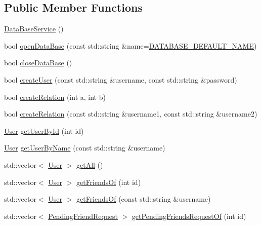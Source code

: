 \subsection*{Public Member Functions}
\begin{DoxyCompactItemize}
\item 
\mbox{\hyperlink{classDataBaseService_ac5820e66451a0393723eb87db0c98c97}{Data\+Base\+Service}} ()
\item 
bool \mbox{\hyperlink{classDataBaseService_a0f1095843e3650701cdd23ae8dbc09d8}{open\+Data\+Base}} (const std\+::string \&name=\mbox{\hyperlink{DataBaseService_8hpp_aed391e0e48987704aefc7aa59b508aa7}{D\+A\+T\+A\+B\+A\+S\+E\+\_\+\+D\+E\+F\+A\+U\+L\+T\+\_\+\+N\+A\+ME}})
\item 
bool \mbox{\hyperlink{classDataBaseService_a1106f4f3393298f38e66b8a7b6bc5dc1}{close\+Data\+Base}} ()
\item 
bool \mbox{\hyperlink{classDataBaseService_af13f9198530eda7dae7d4308ea25258c}{create\+User}} (const std\+::string \&username, const std\+::string \&password)
\item 
bool \mbox{\hyperlink{classDataBaseService_a1c133b9b35bb83281c96a1ccbf08aa5f}{create\+Relation}} (int a, int b)
\item 
bool \mbox{\hyperlink{classDataBaseService_a72fd8d920d0483b01db15518fa578e15}{create\+Relation}} (const std\+::string \&username1, const std\+::string \&username2)
\item 
\mbox{\hyperlink{structUser}{User}} \mbox{\hyperlink{classDataBaseService_a04a13e93541e53fa750bf169ec0b5b85}{get\+User\+By\+Id}} (int id)
\item 
\mbox{\hyperlink{structUser}{User}} \mbox{\hyperlink{classDataBaseService_a1e0272ebe8dd31859b810e6f797cde5b}{get\+User\+By\+Name}} (const std\+::string \&username)
\item 
std\+::vector$<$ \mbox{\hyperlink{structUser}{User}} $>$ \mbox{\hyperlink{classDataBaseService_a1226c799e69e1417202366d4c2f7137d}{get\+All}} ()
\item 
std\+::vector$<$ \mbox{\hyperlink{structUser}{User}} $>$ \mbox{\hyperlink{classDataBaseService_ac82ba94d3e80ccc2f576b14bf71c8c2e}{get\+Friends\+Of}} (int id)
\item 
std\+::vector$<$ \mbox{\hyperlink{structUser}{User}} $>$ \mbox{\hyperlink{classDataBaseService_a11c94f12e798e1bf70afa4581fa7c8b0}{get\+Friends\+Of}} (const std\+::string \&username)
\item 
std\+::vector$<$ \mbox{\hyperlink{structPendingFriendRequest}{Pending\+Friend\+Request}} $>$ \mbox{\hyperlink{classDataBaseService_a14110b164fa5ae2af7edb53ba58f38df}{get\+Pending\+Friends\+Request\+Of}} (int id)

\end{DoxyCompactItemize}
